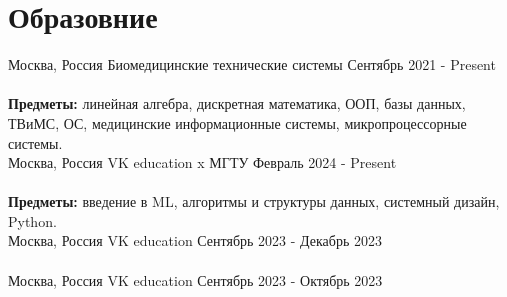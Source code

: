 \documentclass[letterpaper,10pt]{article}
\begin{document}
  \resumeSubHeadingListEnd



  


\section{Образовние}
  \resumeSubHeadingListStart
    
    \resumeEducationSubheading
    { }{ Москва, Россия }
    { Биомедицинские технические системы }
    { Сентябрь 2021 - Present } \\\\
    \textbf{Предметы:} линейная алгебра, дискретная математика, ООП, базы данных, ТВиМС, ОС, медицинские информационные системы, микропроцессорные системы.\\

    \resumeEducationSubheading
    { }{ Москва, Россия }
    { VK education x МГТУ }{ Февраль 2024 - Present } \\\\
    \textbf{Предметы:} введение в ML, алгоритмы и структуры данных, системный дизайн, Python. \\

    \resumeEducationSubheading
    {}{Москва, Россия}
    {VK education}{ Сентябрь 2023 - Декабрь 2023 } \\\\

    \resumeEducationSubheading
    {}{Москва, Россия}
    {VK education}{ Сентябрь 2023 - Октябрь 2023 } \\\\

    

      
    
  \resumeSubHeadingListEnd
\end{document}
